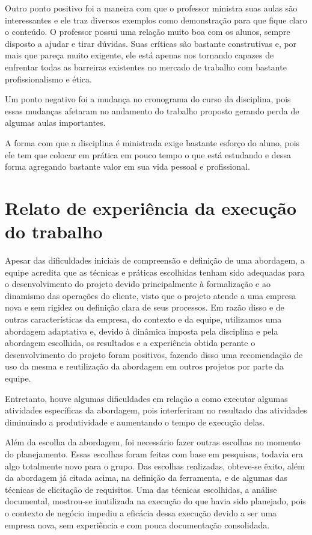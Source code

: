 \indent Outro ponto positivo foi a maneira com que o professor ministra suas aulas são interessantes e ele traz diversos 
exemplos como demonstração para que fique claro o conteúdo. O professor possui uma relação muito boa com os alunos, sempre
disposto a ajudar e tirar dúvidas. Suas críticas são bastante construtivas e, por mais que pareça muito exigente, ele está 
apenas nos tornando capazes de enfrentar todas as barreiras existentes no mercado de trabalho com bastante profissionalismo 
e ética.

\indent Um ponto negativo foi a mudança no cronograma do curso da disciplina, pois essas mudanças afetaram no andamento do 
trabalho proposto gerando perda de algumas aulas importantes.

\indent A forma com que a disciplina é ministrada exige bastante esforço do aluno, pois ele tem que colocar em prática em 
pouco tempo o que está estudando e dessa forma agregando bastante valor em sua vida pessoal e profissional.


\section{Relato de experiência da execução do trabalho}

\indent Apesar das dificuldades iniciais de compreensão e definição de uma abordagem, a equipe acredita que as técnicas e 
práticas escolhidas tenham sido adequadas para o desenvolvimento do projeto devido principalmente à formalização e ao 
dinamismo das operações do cliente, visto que o projeto atende a uma empresa nova e sem rigidez ou definição clara de seus 
processos. Em razão disso e de outras características da empresa, do contexto e da equipe, utilizamos uma abordagem adaptativa 
e, devido à dinâmica imposta pela disciplina e pela abordagem escolhida, os resultados e a experiência obtida perante o 
desenvolvimento do projeto foram positivos, fazendo disso uma recomendação de uso da mesma e reutilização da abordagem em 
outros projetos por parte da equipe.

\indent Entretanto, houve algumas dificuldades em relação a como executar algumas atividades específicas da abordagem, pois 
interferiram no resultado das atividades diminuindo a produtividade e aumentando o tempo de execução delas.

\indent Além da escolha da abordagem, foi necessário fazer outras escolhas no momento do planejamento. Essas escolhas foram 
feitas com base em pesquisas, todavia era algo totalmente novo para o grupo. Das escolhas realizadas, obteve-se êxito, além 
da abordagem já citada acima, na definição da ferramenta, e de algumas das técnicas de elicitação de requisitos. Uma das 
técnicas escolhidas, a análise documental, mostrou-se inutilizada na execução do que havia sido planejado, pois o contexto 
de negócio impediu a eficácia dessa execução devido a ser uma empresa nova, sem experiência e com pouca documentação 
consolidada.

